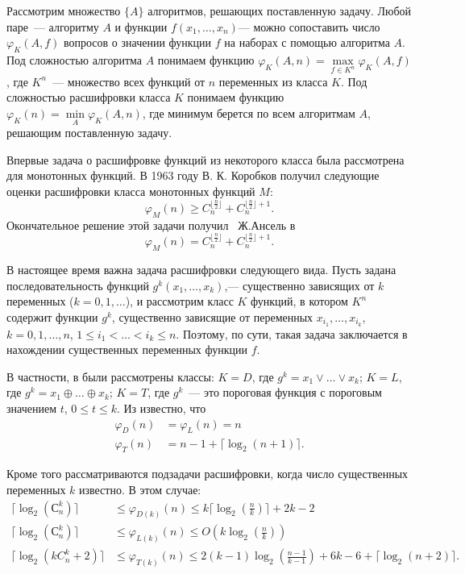 \documentclass[oneside, final, 14pt]{extreport}
\begin{document}
	Рассмотрим множество $\{A\}$ алгоритмов, решающих поставленную задачу. Любой паре~--- алгоритму $A$ и функции $f(x_1, \ldots, x_n)$--- 
	можно сопоставить число $\varphi_K(A,f)$ вопросов о значении функции $f$ на наборах с помощью алгоритма $A$. Под сложностью  
	алгоритма $A$ понимаем функцию $\varphi_K(A,n) = \max\limits_{f \in K^n}\varphi_K(A, f)$, где $K^n$~--- множество всех функций от $n$ переменных
	из класса $K$. Под сложностью расшифровки класса $K$ понимаем функцию $\varphi_K(n) = \min\limits_A\varphi_K(A, n)$, где минимум берется по всем 
	алгоритмам $A$, решающим поставленную задачу.
	
	Впервые задача о расшифровке функций из некоторого класса была рассмотрена для монотонных функций. В 1963 году В. К. Коробков  \cite{korobkov}
	получил следующие оценки расшифровки класса монотонных функций $M$: 
	$$ \varphi_M(n) \geq C_n^{\lfloor \frac{n}{2} \rfloor} +  C_n^{\lfloor \frac{n}{2} \rfloor +1}.$$
	Окончательное решение этой задачи получил  Ж.Ансель в \cite{hansel}  
	$$ \varphi_M(n) = C_n^{\lfloor \frac{n}{2} \rfloor} +  C_n^{\lfloor \frac{n}{2} \rfloor +1}. $$

	В настоящее время важна задача расшифровки следующего вида. Пусть задана последовательность функций $g^k(x_1, \ldots, x_k)$,--- существенно 
	зависящих от $k$ переменных ($k = 0, 1, \ldots$), и рассмотрим класс $K$ функций, в котором $K^n$ содержит функции $g^k$, существенно зависящие  
	от переменных $x_{i_1}, \ldots, x_{i_k}$, $k = 0,1, \ldots, n$, $1 \leq i_1 < \ldots < i_k \leq n$. Поэтому, по сути, такая задача заключается в нахождении 
	существенных переменных функции $f$.
	
	В частности, в \cite{tokio} были рассмотрены классы: $K = D$, где $g^k = x_1 \vee \ldots \vee x_k$; $K = L$, где $g^k = x_1 \oplus \ldots \oplus x_k$;
	$K = T$, где $g^k$~--- это пороговая функция с пороговым значением $t$, $0 \leq t \leq k$. Из \cite{tokio} известно, что
	$$
	\begin{aligned}
		\varphi_{D}(n) & = \varphi_{L}(n) = n \\
		\varphi_{T}(n)&= n - 1 + \lceil \log_2(n+1) \rceil.
	\end{aligned} 
	$$
	
	Кроме того рассматриваются подзадачи расшифровки, когда число существенных переменных $k$ известно. В этом случае:
	$$
	\begin{aligned}
	       \lceil \log_2(С_n^k) \rceil & \leq \varphi_{D(k)}(n) \leq k\lceil \log_2(\frac{n}{k}) \rceil + 2k - 2 \\
	        \lceil \log_2(С_n^k) \rceil & \leq \varphi_{L(k)}(n) \leq O(k\log_2(\frac{n}{k})) \\
	\lceil \log_2(kC_n^k + 2) \rceil & \leq \varphi_{T(k)}(n) \leq 2(k-1)\log_2\left(\frac{n-1}{k-1}\right) + 6k - 6 + \lceil \log_2(n+2) \rceil.
	\end{aligned} 
	$$
	
\end{document}
